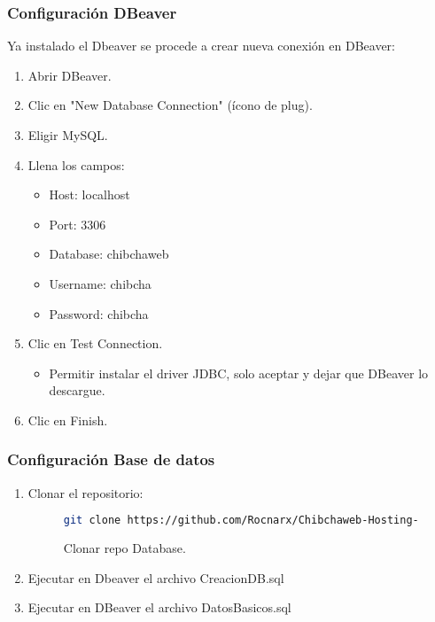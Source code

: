 \subsubsection*{Configuración DBeaver}
Ya instalado el Dbeaver se procede a crear nueva conexión en DBeaver:
\begin{enumerate}
\item Abrir DBeaver.
\item Clic en "New Database Connection" (ícono de plug).
\item Eligir MySQL.
\item Llena los campos:
    \begin{itemize}
    \item Host:	localhost
    \item Port:	3306
    \item Database:	chibchaweb
    \item Username:	chibcha
    \item Password:	chibcha
    \end{itemize}
\item Clic en Test Connection.
    \begin{itemize}
	\item Permitir instalar el driver JDBC, solo aceptar y dejar que DBeaver lo descargue.
    \end{itemize}
\item Clic en Finish.
\end{enumerate}

\subsubsection*{Configuración Base de datos}
\begin{enumerate}
	\item Clonar el repositorio:

	\begin{figure}
	\begin{lstlisting}[language=bash]
git clone https://github.com/Rocnarx/Chibchaweb-Hosting-Platform-Database.git
    \end{lstlisting}
    \caption{Clonar repo Database.}
    \label{fig:clonar-db}
    \end{figure}
     \item Ejecutar en Dbeaver el archivo CreacionDB.sql
     \item Ejecutar en DBeaver el archivo DatosBasicos.sql

\end{enumerate}

